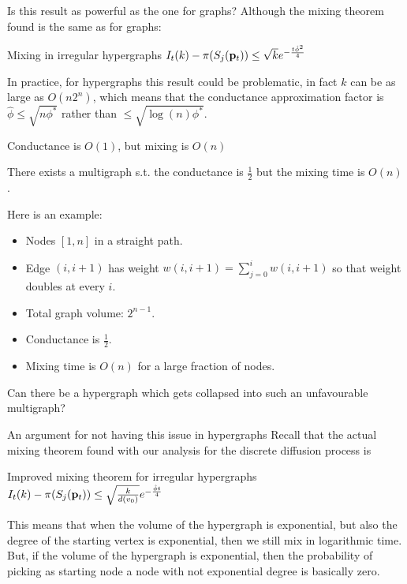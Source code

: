 \documentclass[../main.tex]{subfiles}
\begin{document}
    \begin{frame}{Is this result as powerful as the one for graphs?} 
    	Although the mixing theorem found is the same as for graphs:
    	
		\begin{block}{Mixing in irregular hypergraphs}
			$I_t(k) - \pi(S_j(\bold{p}_{t})) \leq \sqrt{k} e^{-\frac{t\hat{\phi}^2}{4}}$
		\end{block}
	
		In practice, for hypergraphs this result could be problematic, in fact $k$ can be as large as $O(n2^n)$, which means that the conductance approximation factor is $\hat{\phi} \leq \sqrt{n\phi^*}$ rather than $\leq \sqrt{\log(n)\phi^*}$.    
	\end{frame}	

	\begin{frame}{Conductance is $O(1)$, but mixing is $O(n)$}
		\begin{lemma}
			There exists a multigraph s.t. the conductance is $\frac{1}{2}$ but the mixing time is $O(n)$.
		\end{lemma}
		Here is an example: 
		\begin{itemize}
			\item Nodes $[1,n]$ in a straight path.
			\item Edge $(i,i+1)$ has weight $w(i,i+1) = \sum_{j=0}^{i} w(i,i+1)$ so that weight doubles at every $i$.
			\item Total graph volume: $2^{n-1}$.
			\item Conductance is $\frac{1}{2}$.
			\item Mixing time is $O(n)$ for a large fraction of nodes.
		\end{itemize}
		Can there be a hypergraph which gets collapsed into such an unfavourable multigraph?
	\end{frame}

	\begin{frame}{An argument for not having this issue in hypergraphs}
		Recall that the actual mixing theorem found with our analysis for the discrete diffusion process is
		\begin{block}{Improved mixing theorem for irregular hypergraphs}
			$I_t(k) - \pi(S_j(\bold{p}_t)) \leq \sqrt{\frac{k}{d(v_0)}}e^{-\frac{\hat{\phi}t}{
			4}}$
		\end{block}
		This means that when the volume of the hypergraph is exponential, but also the degree of the starting vertex is exponential, then we still mix in logarithmic time. But, if the volume of the hypergraph is exponential, then the probability of picking as starting node a node with not exponential degree is basically zero.
	\end{frame}
\end{document}
